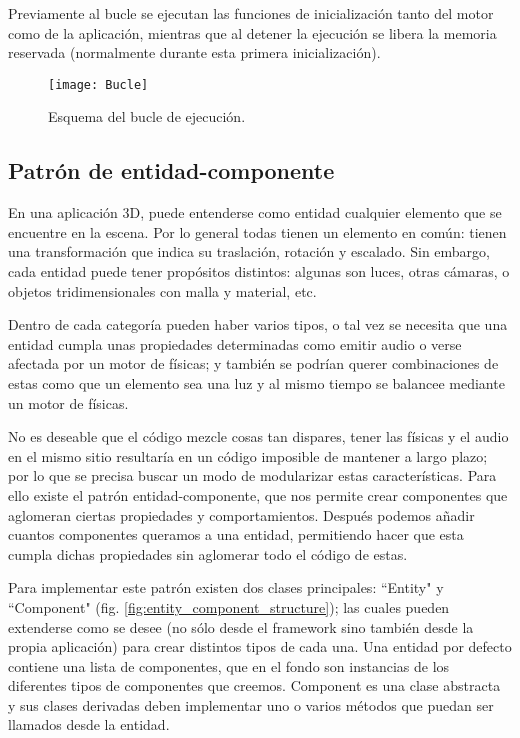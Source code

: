 Previamente al bucle se ejecutan las funciones de inicialización tanto del motor como de la aplicación, mientras que al detener la ejecución se libera la memoria reservada (normalmente durante esta primera inicialización).

\begin{figure}[H]
    \centering
    \texttt{[image: Bucle]}
    \caption{Esquema del bucle de ejecución.}
    \label{fig:bucle}
\end{figure}

\subsection{Patrón de entidad-componente}
\label{entity_component}
En una aplicación 3D, puede entenderse como entidad cualquier elemento que se encuentre en la escena. Por lo general todas tienen un elemento en común: tienen una transformación que indica su traslación, rotación y escalado. Sin embargo, cada entidad puede tener propósitos distintos: algunas son luces, otras cámaras, o objetos tridimensionales con malla y material, etc.

Dentro de cada categoría pueden haber varios tipos, o tal vez se necesita que una entidad cumpla unas propiedades determinadas como emitir audio o verse afectada por un motor de físicas; y también se podrían querer combinaciones de estas como que un elemento sea una luz y al mismo tiempo se balancee mediante un motor de físicas.

No es deseable que el código mezcle cosas tan dispares, tener las físicas y el audio en el mismo sitio resultaría en un código imposible de mantener a largo plazo; por lo que se precisa buscar un modo de modularizar estas características. Para ello existe el patrón entidad-componente, que nos permite crear componentes que aglomeran ciertas propiedades y comportamientos. Después podemos añadir cuantos componentes queramos a una entidad, permitiendo hacer que esta cumpla dichas propiedades sin aglomerar todo el código de estas.

Para implementar este patrón existen dos clases principales: ``Entity" y ``Component" (fig. \ref{fig:entity_component_structure}); las cuales pueden extenderse como se desee (no sólo desde el framework sino también desde la propia aplicación) para crear distintos tipos de cada una. Una entidad por defecto contiene una lista de componentes, que en el fondo son instancias de los diferentes tipos de componentes que creemos. Component es una clase abstracta y sus clases derivadas deben implementar uno o varios métodos que puedan ser llamados desde la entidad.

